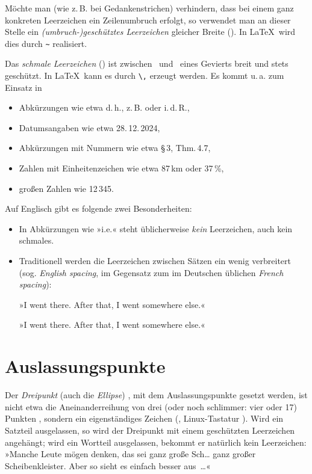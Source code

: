 Möchte man (wie z.\,B. bei Gedankenstrichen) verhindern, dass bei einem
ganz konkreten Leerzeichen ein Zeilenumbruch erfolgt, so verwendet man an dieser
Stelle ein \emph{(umbruch-)geschütztes Leerzeichen} gleicher Breite
(). In \LaTeX\ wird dies durch \verb!~! realisiert.

Das \emph{schmale Leerzeichen} () ist zwischen \ und
\ eines Gevierts breit und stets geschützt. In \LaTeX\ kann
es durch \verb!\,! erzeugt werden. Es kommt u.\,a. zum Einsatz in
\begin{itemize}[nosep]
\item Abkürzungen wie etwa d.\,h., z.\,B. oder i.\,d.\,R.,
\item Datumsangaben wie etwa 28.\,12.\,2024,
\item Abkürzungen mit Nummern wie etwa §\,3, Thm.\,4.7,
\item Zahlen mit Einheitenzeichen wie etwa 87\,km oder 37\,\%,
\item großen Zahlen wie 12\,345.
\end{itemize}

Auf Englisch gibt es folgende zwei Besonderheiten:
\begin{itemize}[nosep]
\item In Abkürzungen wie »\foreignlanguage{british}{i.e.}« steht
  üblicherweise \emph{kein} Leerzeichen, auch kein schmales.
\item Traditionell werden die Leerzeichen zwischen Sätzen ein wenig
  verbreitert (sog. \emph{\foreignlanguage{british}{English spacing}},
  im Gegensatz zum im Deutschen üblichen
  \emph{\foreignlanguage{british}{French spacing}}):

  »\foreignlanguage{british}{I went there.  After that, I went
    somewhere else.}«

  »\foreignlanguage{british}{\frenchspacing I went there.  After that,
    I went somewhere else.}«
\end{itemize}


\section{Auslassungspunkte}

Der \emph{Dreipunkt} (auch die \emph{Ellipse}) , mit dem
Auslassungspunkte gesetzt werden, ist nicht etwa die Aneinanderreihung
von drei (oder noch schlimmer: vier oder 17) Punkten ,
sondern ein eigenständiges Zeichen (, Linux-Tastatur
).  Wird ein Satzteil ausgelassen, so wird der
Dreipunkt mit einem geschützten Leerzeichen angehängt; wird ein
Wortteil ausgelassen, bekommt er natürlich kein Leerzeichen: »Manche
Leute mögen denken, das sei ganz große Sch… ganz großer
Scheibenkleister.  Aber so sieht es einfach besser aus~…«

